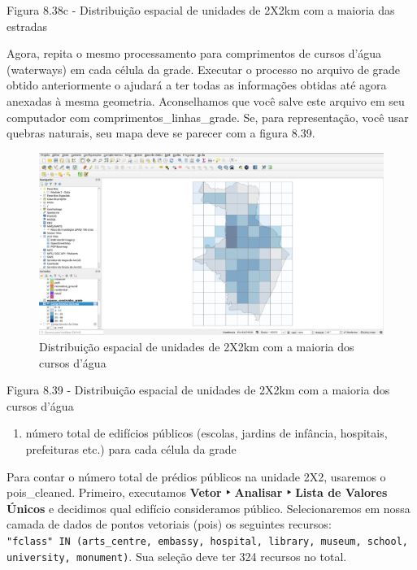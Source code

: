 \documentclass[
]{book}
\providecommand{\tightlist}{%
  \setlength{\itemsep}{0pt}\setlength{\parskip}{0pt}}
\begin{document}
Figura 8.38c - Distribuição espacial de unidades de 2X2km com a maioria das estradas

Agora, repita o mesmo processamento para comprimentos de cursos d'água (waterways) \hspace{0pt}\hspace{0pt}em cada célula da grade. Executar o processo no arquivo de grade obtido anteriormente o ajudará a ter todas as informações obtidas até agora anexadas à mesma geometria. Aconselhamos que você salve este arquivo em seu computador com comprimentos\_linhas\_grade. Se, para representação, você usar quebras naturais, seu mapa deve se parecer com a figura 8.39.

\begin{figure}
\centering
\includegraphics{media/modulo8/fig839.png}
\caption{Distribuição espacial de unidades de 2X2km com a maioria dos cursos d'água}
\end{figure}

Figura 8.39 - Distribuição espacial de unidades de 2X2km com a maioria dos cursos d'água

\begin{enumerate}
\def\labelenumi{\arabic{enumi}.}
\setcounter{enumi}{2}
\tightlist
\item
  número total de edifícios públicos (escolas, jardins de infância, hospitais, prefeituras etc.) para cada célula da grade
\end{enumerate}

Para contar o número total de prédios públicos na unidade 2X2, usaremos o pois\_cleaned. Primeiro, executamos \textbf{Vetor ‣ Analisar ‣ Lista de Valores Únicos} e decidimos qual edifício consideramos público. Selecionaremos em nossa camada de dados de pontos vetoriais (pois) os seguintes recursos: \texttt{"fclass"\ IN\ (\textquotesingle{}arts\_centre\textquotesingle{},\ \textquotesingle{}embassy\textquotesingle{},\ \textquotesingle{}hospital\textquotesingle{},\ \textquotesingle{}library\textquotesingle{},\ \textquotesingle{}museum\textquotesingle{},\ \textquotesingle{}school\textquotesingle{},\ \textquotesingle{}university\textquotesingle{},\ \textquotesingle{}monument\textquotesingle{})}. Sua seleção deve ter 324 recursos no total.
\end{document}
